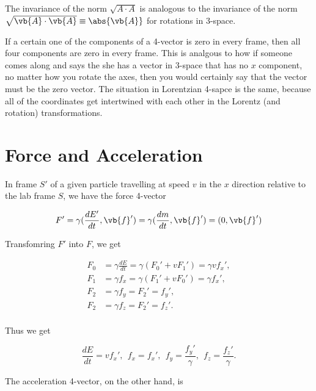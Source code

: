 \documentclass[english,a4paper,12pt]{report}
\begin{document}
The invariance of the norm \(\sqrt{A \cdot A} \) is analogous to the invariance of the norm \(\sqrt{\vb{A} \cdot \vb{A} } \equiv \abs{\vb{A} } \) for rotations in 3-space. 

If a certain one of the components of a 4-vector is zero in every frame, then all four components are zero in every frame. This is analgous to how if someone comes along and says the she has a vector in 3-space that has no \(x\) component, no matter how you rotate the axes, then you would certainly say that the vector must be the zero vector. The situation in Lorentzian 4-sapce is the same, because all of the coordinates get intertwined with each other in the Lorentz (and rotation) transformations.
\section{Force and Acceleration}

In frame \(S'\) of a given particle travelling at speed \(v\) in the \(x\) direction relative to the lab frame \(S\), we have the force 4-vector

\begin{equation}
    F' = \gamma (\frac{dE'}{dt}, \vb{f} ' ) = \gamma ( \frac{dm}{dt}, \vb{f} ' ) = (0, \vb{f} ')
\end{equation}

Transfomring \(F'\) into \(F\), we get

\begin{equation}
    \begin{aligned}
        F_0 &= \gamma \frac{dE}{dt} = \gamma (F_0 ' + v F_1 ') = \gamma v f_{x}' , \\
        F_1 &= \gamma f_{x} =  \gamma (F_1 ' + v F_0 ') = \gamma f_{x}', \\
        F_2 &= \gamma f_{y} = F_2 ' =  f_{y}' , \\
        F_2 &= \gamma f_{z} = F_2 ' =  f_{z}' . \\
    \end{aligned}
\end{equation}

Thus we get 

\begin{equation}
        \frac{dE}{dt} = vf_{x}',  ~~
        f_{x} = f_{x}', ~~
        f_{y} = \frac{f_{y}' }{\gamma }, ~~
        f_{z} = \frac{f_{z}' }{\gamma }.   
\end{equation}

The acceleration 4-vector, on the other hand, is 
\end{document}
